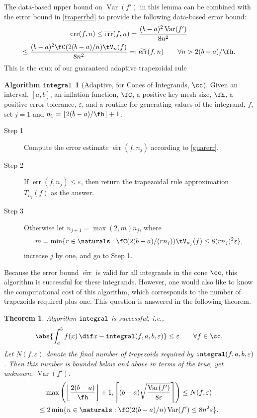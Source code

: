 \documentclass[]{article}
\DeclareMathOperator{\integ}{\texttt{\textup{integral}}}
\DeclareMathOperator{\Var}{Var}
\DeclareMathOperator{\err}{err}
\newcommand{\oerr}{\overline{\err}}
\newcommand{\terr}{\widetilde{\err}}
\newtheorem{theorem}{Theorem}
\theoremstyle{definition}
\newtheorem*{guaralgo}{Algorithm $\integ$}
\theoremstyle{remark}
\newcommand{\hcut}{\fh}
\begin{document}
The data-based upper bound on $\Var(f')$ in this lemma can be combined with the error bound in \eqref{traperrbd} to provide the following data-based error bound:
\begin{multline}\label{guarerr}
\err(f,n) \le \oerr(f,n) = \frac{(b-a)^2 \Var(f')}{8 n^2} \\ \le  \frac{(b-a)^2 \fC(2(b-a)/n) \tV_n(f)}{8 n^2} =: \terr(f,n) \qquad \forall n>2(b-a)/\hcut.
\end{multline}
This is the crux of our guaranteed adaptive trapezoidal rule 

\begin{guaralgo} [Adaptive, for Cones of Integrands, $\cc$] Given an interval, $[a,b]$, an inflation function, $\fC$, a positive key mesh size, $\hcut$, a positive error tolerance, $\varepsilon$, and a routine for generating values of the integrand, $f$, set $j=1$ and $n_1 = \left \lfloor 2(b-a)/\hcut \right \rfloor +1$.
\begin{description}
\item[Step 1] Compute the error estimate $\terr(f,n_j)$ according to \eqref{guarerr}.

\item [Step 2] If $\terr(f,n_j) \le \varepsilon$, then return the trapezoidal rule approximation $T_{n_j}(f)$ as the answer.  

\item [Step 3] Otherwise let $n_{j+1} = \max(2,m) n_j$, where
\begin{equation}\label{algo1n}
m = \min\{ r \in \naturals : \fC(2(b-a)/(rn_j)) \tV_{n_j}(f) \le 8 (r n_j)^2 \varepsilon \},
\end{equation}
increase $j$ by one, and go to Step 1.

\end{description}
\end{guaralgo}

Because the error bound $\terr$ is valid for all integrands in the cone $\cc$, this algorithm is successful for these integrands.  However, one would also like to know the computational cost of this algorithm, which corresponds to the number of trapezoids required plus one.  This question is answered in the following theorem.

\begin{theorem} \label{conealgothm}
Algorithm $\integ$ is successful, i.e.,  
\[
\abs{\int_a^b f(x) \, \dif x - \integ(f,a,b,\varepsilon)} \le \varepsilon \qquad \forall f \in \cc.
\]
Let $N(f,\varepsilon)$ denote the final number of trapezoids required by $\integ(f,a,b,\varepsilon)$.  Then this number is bounded below and above in terms of the true, yet unknown, $\Var(f')$.
\begin{multline}
\max\left(\left \lfloor \frac{2(b-a)}{\hcut} \right \rfloor +1, \left \lceil (b-a) \sqrt{\frac{\Var(f')}{8\varepsilon}} \right \rceil \right) \le
N(f,\varepsilon) \\
\le 2 \min\{ n \in \naturals : \fC(2(b-a)/n) \Var(f') \le 8 n^2 \varepsilon \}.
\end{multline}
\end{theorem}
\end{document}
